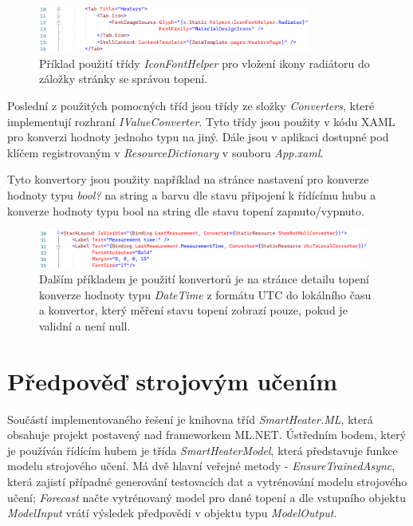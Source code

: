 \begin{figure}[hbt]
\includegraphics[width=0.8\textwidth]{obrazky-figures/code-maui-icons.png}
\caption{Příklad použití třídy {\it IconFontHelper} pro vložení ikony radiátoru do záložky stránky se správou topení.}
\end{figure}

Poslední z použitých pomocných tříd jsou třídy ze složky {\it Converters}, které implementují rozhraní {\it IValueConverter}. Tyto třídy jsou použity v kódu XAML pro konverzi hodnoty jednoho typu na jiný. Dále jsou v aplikaci dostupné pod klíčem registrovaným v {\it ResourceDictionary} v souboru {\it App.xaml}.

Tyto konvertory jsou použity například na stránce nastavení pro konverze hodnoty typu {\it bool?} na string a barvu dle stavu připojení k řídícímu hubu a konverze hodnoty typu bool na string dle stavu topení zapnuto/vypnuto.

\begin{figure}[hbt]
\includegraphics[width=0.97\textwidth]{obrazky-figures/code-maui-converters.png}
\caption{Dalším příkladem je použití konvertorů je na stránce detailu topení konverze hodnoty typu {\it DateTime} z formátu UTC do lokálního času a konvertor, který měření stavu topení zobrazí pouze, pokud je validní a není null.}
\end{figure}

\pagebreak

\section{Předpověď strojovým učením}
Součástí implementovaného řešení je knihovna tříd {\it SmartHeater.ML}, která obsahuje projekt postavený nad frameworkem ML.NET. Ústředním bodem, který je používán řídícím hubem je třída {\it SmartHeaterModel}, která představuje funkce modelu strojového učení. Má dvě hlavní veřejné metody - {\it EnsureTrainedAsync}, která zajistí případné generování testovacích dat a vytrénování modelu strojového učení; {\it Forecast} načte vytrénovaný model pro dané topení a dle vstupního objektu {\it ModelInput} vrátí výsledek předpovědi v objektu typu {\it ModelOutput}.

